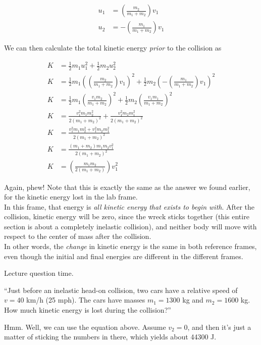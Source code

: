 \begin{align}
u_1 &= \left(\frac{m_2}{m_1 + m_2}\right) v_1\\
u_2 &= - \left(\frac{m_1}{m_1 + m_2}\right) v_1
\end{align}

We can then calculate the total kinetic energy \emph{prior} to the collision as

\begin{align}
K &= \frac{1}{2} m_1 u_1^2 + \frac{1}{2} m_2 u_2^2\\
K &= \frac{1}{2} m_1 \left(\left(\frac{m_2}{m_1 + m_2}\right) v_1\right)^2 + \frac{1}{2} m_2 \left(- \left(\frac{m_1}{m_1 + m_2}\right) v_1\right)^2\\
K &= \frac{1}{2} m_1 \left(\frac{v_1 m_2}{m_1 + m_2}\right)^2 + \frac{1}{2} m_2 \left(\frac{v_1 m_1}{m_1 + m_2}\right)^2\\
K &= \frac{v_1^2 m_1 m_2^2}{2(m_1 + m_2)^2} + \frac{v_1^2 m_2 m_1^2}{2(m_1 + m_2)^2}\\
K &= \frac{v_1^2 m_1 m_2^2 + v_1^2 m_2 m_1^2}{2(m_1 + m_2)^2}\\
K &= \frac{(m_1 + m_2) m_1 m_2 v_1^2}{2(m_1 + m_2)^2}\\
K &= \left(\frac{m_1 m_2}{2(m_1 + m_2)}\right) v_1^2
\end{align}

Again, phew! Note that this is exactly the same as the answer we found earlier, for the kinetic energy lost in the lab frame.\\
In this frame, that energy is \emph{all kinetic energy that exists to begin with}. After the collision, kinetic energy will be zero, since the wreck sticks together (this entire section is about a completely inelastic collision), and neither body will move with respect to the center of mass after the collision.\\
In other words, the \emph{change} in kinetic energy is the same in both reference frames, even though the initial and final energies are different in the different frames.

Lecture question time.

``Just before an inelastic head-on collision, two cars have a relative speed of $v = 40$ km/h (25 mph). The cars have masses $m_1 = 1300$ kg and $m_2 = 1600$ kg.\\
How much kinetic energy is lost during the collision?''

Hmm. Well, we can use the equation above. Assume $v_2 = 0$, and then it's just a matter of sticking the numbers in there, which yields about 44300 J.

